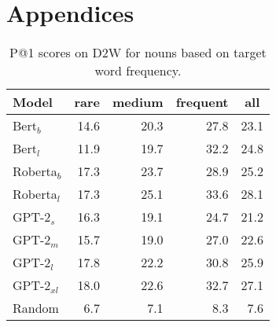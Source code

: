 \documentclass[11pt,a4paper]{article}
\begin{document}
\section{Appendices}
\label{sec:appendix}


\begin{table}[h]
    \centering
    \begin{tabular}{l|rrrr}
    \hline
        \textbf{Model} & \multicolumn{1}{c}{\textbf{rare}} & \multicolumn{1}{c}{\textbf{medium}} & \multicolumn{1}{c}{\textbf{frequent}} & \multicolumn{1}{c}{\textbf{all}} \\ \hline
     Bert$_{b}$ & 14.6 & 20.3 & 27.8 & 23.1 \\
     Bert$_{l}$ & 11.9 & 19.7 & 32.2 & 24.8\\
     Roberta$_{b}$ & 17.3 & 23.7 & 28.9 & 25.2 \\
     Roberta$_{l}$ & 17.3 & 25.1 & 33.6 & 28.1 \\ \hline
     GPT-2$_{s}$ & 16.3 & 19.1 & 24.7 & 21.2 \\
     GPT-2$_{m}$ & 15.7 & 19.0 & 27.0 & 22.6 \\
     GPT-2$_{l}$ & 17.8 & 22.2 & 30.8 & 25.9 \\
     GPT-2$_{xl}$ & 18.0 & 22.6 & 32.7 & 27.1 \\ \hline
     Random & 6.7 & 7.1 & 8.3 & 7.6 \\ \hline 
     
    \end{tabular}
    \caption{P@1 scores on D2W for nouns based on target word frequency.}
    \label{tab:freq_results_D2W}
\end{table}
\end{document}
